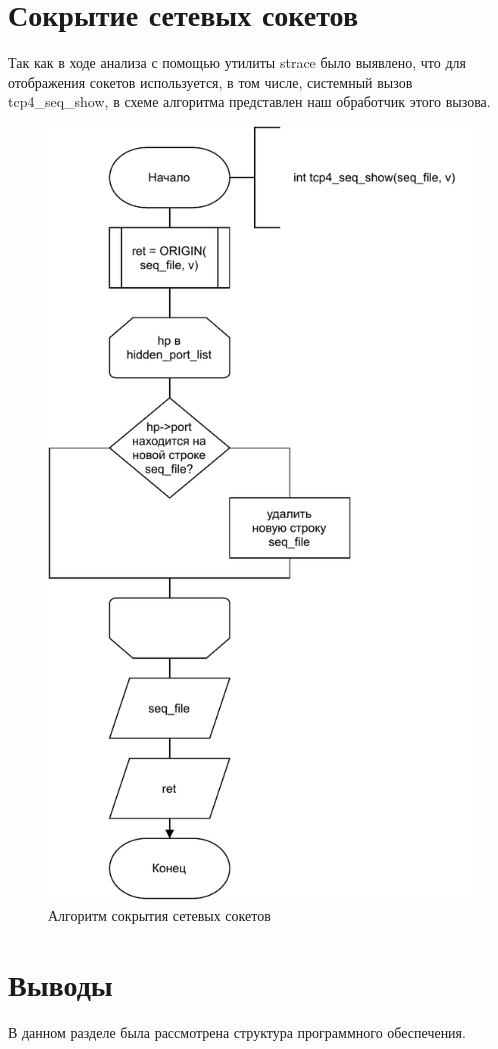 \section{Сокрытие сетевых сокетов}%
\label{sec:skrytie_setevykh_soketov}

Так как в ходе анализа с помощью утилиты strace было выявлено,
что для отображения сокетов используется, в том числе, системный вызов
tcp4\_seq\_show, в схеме алгоритма представлен наш обработчик этого вызова.

\begin{figure}[H]
    \centering
    \includegraphics[scale=0.65]{pdf/oscw_net.pdf}
    \caption{Алгоритм сокрытия сетевых сокетов}\label{img:net_hide_scheme}
\end{figure}




\section{Выводы}%
\label{sec:vyvody}

В данном разделе была рассмотрена структура программного обеспечения.